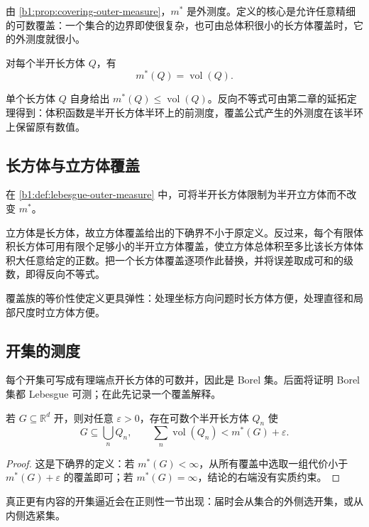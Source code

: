 由 \cref{b1:prop:covering-outer-measure}，\(m^*\) 是外测度。定义的核心是允许任意精细的可数覆盖：一个集合的边界即使很复杂，也可由总体积很小的长方体覆盖时，它的外测度就很小。

\begin{proposition}
\label{b1:prop:rectangle-outer-measure}
对每个半开长方体 \(Q\)，有
\[
m^*(Q)=\operatorname{vol}(Q).
\]
\end{proposition}
\begin{proofsketch}
单个长方体 \(Q\) 自身给出 \(m^*(Q)\leq\operatorname{vol}(Q)\)。反向不等式可由第二章的延拓定理得到：体积函数是半开长方体半环上的前测度，覆盖公式产生的外测度在该半环上保留原有数值。
\end{proofsketch}

\subsection{长方体与立方体覆盖}
\label{b1:subsec:030103}

\begin{proposition}
\label{b1:prop:cube-cover}
在 \cref{b1:def:lebesgue-outer-measure} 中，可将半开长方体限制为半开立方体而不改变 \(m^*\)。
\end{proposition}
\begin{proofsketch}
立方体是长方体，故立方体覆盖给出的下确界不小于原定义。反过来，每个有限体积长方体可用有限个足够小的半开立方体覆盖，使立方体总体积至多比该长方体体积大任意给定的正数。把一个长方体覆盖逐项作此替换，并将误差取成可和的级数，即得反向不等式。
\end{proofsketch}

覆盖族的等价性使定义更具弹性：处理坐标方向问题时长方体方便，处理直径和局部尺度时立方体方便。

\subsection{开集的测度}
\label{b1:subsec:030104}

每个开集可写成有理端点开长方体的可数并，因此是 Borel 集。后面将证明 Borel 集都 Lebesgue 可测；在此先记录一个覆盖解释。

\begin{proposition}
\label{b1:prop:open-cover-approximation}
若 \(G\subseteq\mathbb R^d\) 开，则对任意 \(\varepsilon>0\)，存在可数个半开长方体 \(Q_n\) 使
\[
G\subseteq\bigcup_nQ_n,
\qquad
\sum_n\operatorname{vol}(Q_n)<m^*(G)+\varepsilon.
\]
\end{proposition}
\begin{proof}
这是下确界的定义：若 \(m^*(G)<\infty\)，从所有覆盖中选取一组代价小于 \(m^*(G)+\varepsilon\) 的覆盖即可；若 \(m^*(G)=\infty\)，结论的右端没有实质约束。
\end{proof}

真正更有内容的开集逼近会在正则性一节出现：届时会从集合的外侧选开集，或从内侧选紧集。

